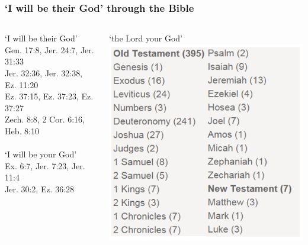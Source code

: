 \begin{frame}
\frametitle{`I will be their God' through the Bible}
\begin{columns}[T]
	\begin{column}{0.45\textwidth}
		`I will be their God'\\{\footnotesize Gen. 17:8, Jer. 24:7, Jer. 31:33\\Jer. 32:36, Jer. 32:38, Ez. 11:20\\Ez. 37:15, Ez. 37:23, Ez. 37:27\\Zech. 8:8, 2 Cor. 6:16, Heb. 8:10}\\~\\
		`I will be your God'\\{\footnotesize Ex. 6:7, Jer. 7:23, Jer. 11:4\\Jer. 30:2, Ez. 36:28}\\~\\
	\end{column}
	\begin{column}{0.55\textwidth}
			`the Lord your God'\\ 
			\includegraphics[width=1\columnwidth]{figures/theLordYourGodTwoColumn.png}
	\end{column}
\end{columns}
\end{frame}

